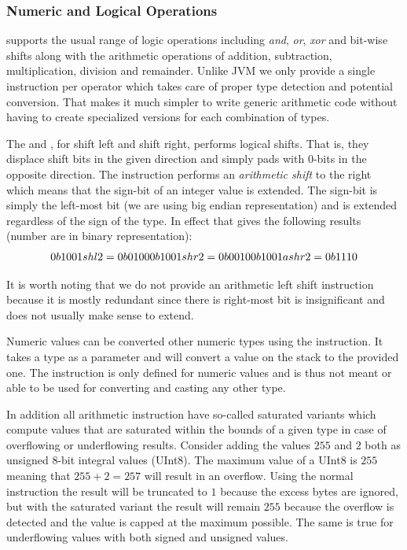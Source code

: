 \subsubsection{Numeric and Logical Operations}

\thename{} supports the usual range of logic operations including \emph{and},
\emph{or}, \emph{xor} and bit-wise shifts along with the arithmetic operations
of addition, subtraction, multiplication, division and remainder. Unlike JVM we
only provide a single instruction per operator which takes care of proper type
detection and potential conversion. That makes it much simpler to write generic
arithmetic code without having to create specialized versions for each
combination of types.

The  and , for shift left and shift right, performs logical
shifts. That is, they displace shift bits in the given direction and simply pads
with 0-bits in the opposite direction. The  instruction performs an
\textit{arithmetic shift} to the right which means that the sign-bit of an
integer value is extended. The sign-bit is simply the left-most bit (we are
using big endian representation) and is extended regardless of the sign of the
type. In effect that gives the following results (number are in binary
representation):
\[
0b1001 shl 2  = 0b0100 \\
0b1001 shr 2  = 0b0010 \\
0b1001 ashr 2 = 0b1110 \\
\]

It is worth noting that we do not provide an arithmetic left shift instruction
because it is mostly redundant since there is right-most bit is insignificant
and does not usually make sense to extend.

Numeric values can be converted other numeric types using the 
instruction. It takes a type as a parameter and will convert a value on the
stack to the provided one. The  instruction is only defined for
numeric values and is thus not meant or able to be used for converting and
casting any other type.

In addition all arithmetic instruction have so-called saturated variants which
compute values that are saturated within the bounds of a given type in case of
overflowing or underflowing results. Consider adding the values $255$ and $2$
both as unsigned 8-bit integral values (UInt8). The maximum value of a UInt8 is
$255$ meaning that $255+2=257$ will result in an overflow. Using the normal
 instruction the result will be truncated to $1$ because the excess
bytes are ignored, but with the saturated variant the result will remain $255$
because the overflow is detected and the value is capped at the maximum
possible. The same is true for underflowing values with both signed and unsigned
values.

